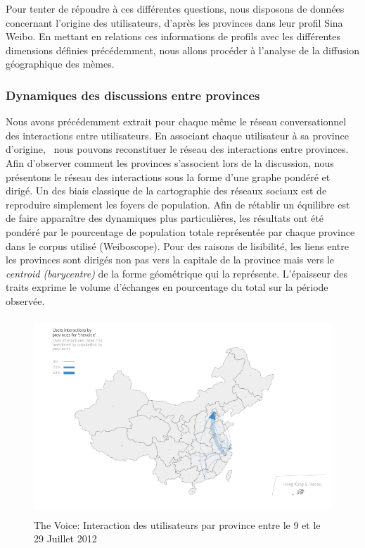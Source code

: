 Pour tenter de r\'epondre \`a ces diff\'erentes questions, nous
disposons de donn\'ees concernant l{\textquoteright}origine des
utilisateurs, d{\textquoteright}apr\`es les provinces dans leur profil
Sina Weibo. En mettant en relations ces informations de profils avec
les diff\'erentes dimensions d\'efinies pr\'ec\'edemment, nous allons
proc\'eder \`a l{\textquoteright}analyse de la diffusion g\'eographique
des m\`emes.

\subsubsection{ Dynamiques des discussions entre provinces}
Nous avons pr\'ec\'edemment extrait pour chaque m\^eme le r\'eseau
conversationnel des interactions entre utilisateurs. En associant
chaque utilisateur \`a sa province d{\textquoteright}origine, \ nous
pouvons reconstituer le r\'eseau des interactions entre provinces. Afin
d{\textquoteright}observer comment les provinces
s{\textquoteright}associent lors de la discussion, nous pr\'esentons le
r\'eseau des interactions sous la forme d{\textquoteright}une graphe
pond\'er\'e et dirig\'e. Un des biais classique de la cartographie des
r\'eseaux sociaux est de reproduire simplement les foyers de
population. Afin de r\'etablir un \'equilibre est de faire appara\^itre
des dynamiques plus particuli\`eres, les r\'esultats ont \'et\'e
pond\'er\'e par le pourcentage de population totale repr\'esent\'ee par
chaque province dans le corpus utilis\'e (Weiboscope). Pour des raisons
de lisibilit\'e, les liens entre les provinces sont dirig\'es non pas
vers la capitale de la province mais vers le \textit{centroid
(barycentre) }de la forme g\'eom\'etrique qui la repr\'esente.
L{\textquoteright}\'epaisseur des traits exprime le volume
d{\textquoteright}\'echanges en pourcentage du total sur la p\'eriode
observ\'ee.

\begin{figure}
    \centering
    
    \includegraphics[width=4.6606in,height=2.913in]{figures/chap4/chapitre4-img19.png}
  \caption{
    The Voice: Interaction des utilisateurs par province entre le 9 et le 29 Juillet 2012
  }
\end{figure}

